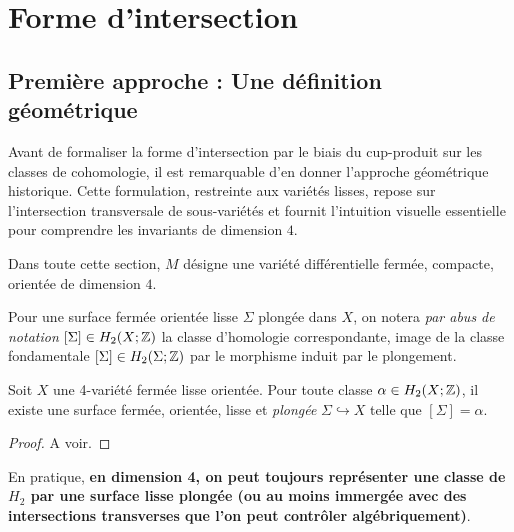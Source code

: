 \section{Forme d'intersection}

\subsection{Première approche : Une définition géométrique}
Avant de formaliser la forme d'intersection par le biais du cup-produit sur les classes de cohomologie, il est remarquable d'en donner l'approche géométrique historique. Cette formulation, restreinte aux variétés lisses, repose sur l'intersection transversale de sous-variétés et fournit l'intuition visuelle essentielle pour comprendre les invariants de dimension $4$.

Dans toute cette section, $M$ désigne une variété différentielle fermée, compacte, orientée de dimension $4$.

\begin{definition}
Pour une surface fermée orientée lisse $\Sigma$ plongée dans $X$, on notera \emph{par abus de notation} $[\Sigma] \in H_2(X;\mathbb{Z})$ la classe d'homologie correspondante, image de la classe fondamentale $[\Sigma] \in H_2(\Sigma;\mathbb{Z})$ par le morphisme induit par le plongement.
\end{definition}

\begin{theorem}
\label{thm:smooth_rep}
Soit $X$ une 4-variété fermée lisse orientée. Pour toute classe $\alpha \in H_2(X;\mathbb{Z})$, il existe une surface fermée, orientée, lisse et \emph{plongée} $\Sigma \hookrightarrow X$ telle que $[\Sigma] = \alpha$.
\end{theorem}

\begin{proof}

A voir.

\end{proof}

\begin{remark}
En pratique, \textbf{en dimension 4, on peut toujours représenter une classe de $H_2$ par une surface lisse plongée (ou au moins immergée avec des intersections transverses que l'on peut contrôler algébriquement)}.
\end{remark}


